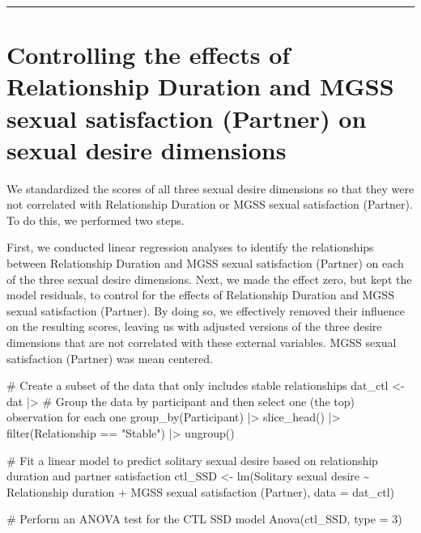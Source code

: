 \documentclass[
  bookmarksnumbered]{article}
\newenvironment{Shaded}{\begin{snugshade}}{\end{snugshade}}
\newcommand{\AttributeTok}[1]{\textcolor[rgb]{0.80,0.80,0.80}{#1}}
\newcommand{\CommentTok}[1]{\textcolor[rgb]{0.50,0.62,0.50}{#1}}
\newcommand{\DecValTok}[1]{\textcolor[rgb]{0.86,0.86,0.80}{#1}}
\newcommand{\FunctionTok}[1]{\textcolor[rgb]{0.94,0.94,0.56}{#1}}
\newcommand{\NormalTok}[1]{\textcolor[rgb]{0.80,0.80,0.80}{#1}}
\newcommand{\OtherTok}[1]{\textcolor[rgb]{0.94,0.94,0.56}{#1}}
\newcommand{\SpecialCharTok}[1]{\textcolor[rgb]{0.86,0.64,0.64}{#1}}
\newcommand{\StringTok}[1]{\textcolor[rgb]{0.80,0.58,0.58}{#1}}
\begin{document}
\begin{center}\rule{0.5\linewidth}{0.5pt}\end{center}

\section{Controlling the effects of Relationship Duration and MGSS sexual satisfaction (Partner) on sexual desire dimensions}\label{controlling-the-effects-of-relationship-duration-and-mgss-sexual-satisfaction-partner-on-sexual-desire-dimensions}

We standardized the scores of all three sexual desire dimensions so that they were not correlated with Relationship Duration or MGSS sexual satisfaction (Partner). To do this, we performed two steps.

First, we conducted linear regression analyses to identify the relationships between Relationship Duration and MGSS sexual satisfaction (Partner) on each of the three sexual desire dimensions. Next, we made the effect zero, but kept the model residuals, to control for the effects of Relationship Duration and MGSS sexual satisfaction (Partner). By doing so, we effectively removed their influence on the resulting scores, leaving us with adjusted versions of the three desire dimensions that are not correlated with these external variables. MGSS sexual satisfaction (Partner) was mean centered.

\begin{Shaded}
\begin{Highlighting}[]
\CommentTok{\# Create a subset of the data that only includes stable relationships}
\NormalTok{dat\_ctl }\OtherTok{\textless{}{-}}\NormalTok{ dat }\SpecialCharTok{|\textgreater{}}
  \CommentTok{\# Group the data by participant and then select one (the top) observation for each one}
  \FunctionTok{group\_by}\NormalTok{(Participant) }\SpecialCharTok{|\textgreater{}}
  \FunctionTok{slice\_head}\NormalTok{() }\SpecialCharTok{|\textgreater{}}
  \FunctionTok{filter}\NormalTok{(Relationship }\SpecialCharTok{==} \StringTok{"Stable"}\NormalTok{) }\SpecialCharTok{|\textgreater{}}
  \FunctionTok{ungroup}\NormalTok{()}

\CommentTok{\# Fit a linear model to predict solitary sexual desire based on relationship duration and partner satisfaction}
\NormalTok{ctl\_SSD }\OtherTok{\textless{}{-}} \FunctionTok{lm}\NormalTok{(}\StringTok{\textasciigrave{}}\AttributeTok{Solitary sexual desire}\StringTok{\textasciigrave{}} \SpecialCharTok{\textasciitilde{}} 
                \StringTok{\textasciigrave{}}\AttributeTok{Relationship duration}\StringTok{\textasciigrave{}} \SpecialCharTok{+} \StringTok{\textasciigrave{}}\AttributeTok{MGSS sexual satisfaction (Partner)}\StringTok{\textasciigrave{}}\NormalTok{,}
              \AttributeTok{data =}\NormalTok{ dat\_ctl)}

\CommentTok{\# Perform an ANOVA test for the CTL SSD model}
\FunctionTok{Anova}\NormalTok{(ctl\_SSD, }\AttributeTok{type =} \DecValTok{3}\NormalTok{)}
\end{Highlighting}
\end{Shaded}
\end{document}

